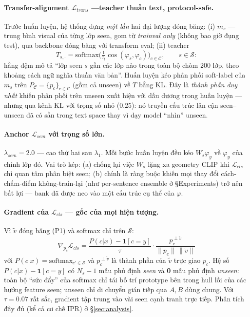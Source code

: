 \documentclass[10pt,twocolumn,letterpaper]{article}
\newcommand{\Seen}{\mathcal{S}}
\newcommand{\All}{\mathcal{C}}
\newcommand{\vtilde}{\tilde{v}}
\begin{document}
\paragraph{Transfer-alignment $\mathcal L_{trans}$ —teacher thuần text, protocol-safe.}
Trước huấn luyện, hệ thống dựng \emph{một lần} hai đại lượng đóng băng: (i) $m_s$ — trung bình visual của từng lớp seen, gom từ \emph{trainval only} (không bao giờ đụng test), qua backbone đóng băng với transform eval; (ii) teacher
\begin{equation}
T_{s,\cdot} = \mathrm{softmax}\Big(\tfrac{1}{\tau_t}\cos(\varphi_s,\varphi_c)\Big)_{c\in\All},\qquad s\in\Seen:
\label{eq:teacher}
\end{equation}
hằng đệm mô tả ``lớp seen $s$ gần các lớp nào trong toàn bộ chòm 200 lớp, theo khoảng cách ngữ nghĩa thuần văn bản''. Huấn luyện kéo phân phối soft-label của $m_s$ trên $P_{\All} = \{p_c\}_{c\in\All}$ (gồm cả unseen) về $T$ bằng KL. Đây là \emph{thành phần duy nhất} khiến phân phối trên unseen xuất hiện với dấu dương trong huấn luyện — nhưng qua kênh KL với trọng số nhỏ ($0.25$): nó truyền cấu trúc lân cận seen--unseen đã có sẵn trong text space thay vì dạy model ``nhìn'' unseen.

\paragraph{Anchor $\mathcal L_{sem}$ với trọng số lớn.}
$\lambda_{sem}=2.0$ — cao thứ hai sau $\lambda_1$. Mỗi bước huấn luyện đều kéo $W_s\varphi_y$ về $\varphi_y$ của chính lớp đó. Vai trò kép: (a) chống lại việc $W_s$ lặng xa geometry CLIP khi $\mathcal L_{cls}$ chỉ quan tâm phân biệt seen; (b) chính là ràng buộc khiến mọi thay đổi cách-chấm-điểm không-train-lại (như per-sentence ensemble ở §Experiments) trở nên bất lợi — bank đã được neo vào một cấu trúc cụ thể của $\varphi$.

\paragraph{Gradient của $\mathcal L_{cls}$ — gốc của mọi hiện tượng.}
Vì $\vtilde$ đóng băng (P1) và softmax chỉ trên $\Seen$:
\begin{equation}
\nabla_{p_c}\mathcal L_{cls}
= \frac{P(c|x)-\mathbf 1[c{=}y]}{\tau}\cdot
\frac{p_c^{\perp\vtilde}}{\|p_c\|\,\|\vtilde\|}
\label{eq:gradcls}
\end{equation}
với $P(c|x)=\mathrm{softmax}_{c'\in\Seen}$ và $p_c^{\perp\vtilde}$ là thành phần của $\vtilde$ trực giao $p_c$. Hệ số $P(c|x)-\mathbf 1[c{=}y]$ có $N_s-1$ mẫu phủ định \emph{seen} và \textbf{0} mẫu phủ định \emph{unseen}: toàn bộ ``sức đẩy'' của softmax chỉ tái bố trí prototype bên trong hull lồi của các hướng feature seen; unseen chỉ di chuyển gián tiếp qua $A,B$ dùng chung. Với $\tau=0.07$ rất sắc, gradient tập trung vào vài seen cạnh tranh trực tiếp. Phân tích đầy đủ (kể cả cơ chế IPR) ở §\ref{sec:analysis}.
\end{document}
